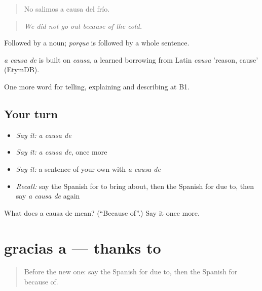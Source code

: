 \begin{quote}
No salimos a causa del frío.
\end{quote}

\begin{quote}
\emph{We did not go out because of the cold.}
\end{quote}

Followed by a noun; \emph{porque} is followed by a whole sentence.

\begin{cousinweb}
\emph{a causa de} is built on \emph{causa}, a learned borrowing from Latin \emph{causa} 'reason, cause' (EtymDB).
\end{cousinweb}

\begin{grammarlens}[title={What you've built}]
One more word for telling, explaining and describing at B1.
\end{grammarlens}

\subsection*{Your turn}
\begin{itemize}
\raggedright
  \item \emph{Say it:} \emph{a causa de}
  \item \emph{Say it:} \emph{a causa de}, once more
  \item \emph{Say it:} a sentence of your own with \emph{a causa de}
  \item \emph{Recall:} say the Spanish for to bring about, then the Spanish for due to, then say \emph{a causa de} again
\end{itemize}

\begin{tcolorbox}[breakable,colback=teal!4,colframe=teal!35!black,title={Before you move on}]
What does a causa de mean? (\textquotedblleft{}Because of\textquotedblright{}.) Say it once more.
\end{tcolorbox}
\section[gracias a]{gracias a — thanks to}

\label{lesson:ES-C581-gracias-a}



\begin{quote}
Before the new one: say the Spanish for due to, then the Spanish for because of.
\end{quote}

